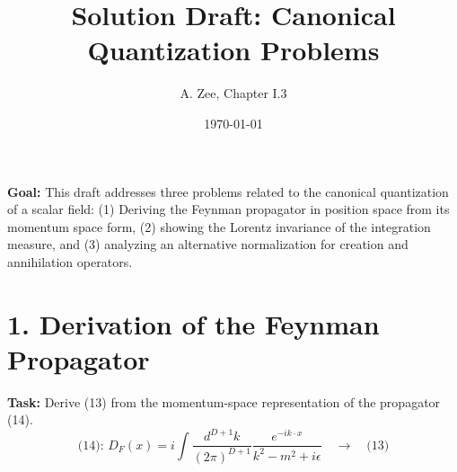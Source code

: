 \documentclass[11pt, a4paper]{article}
\title{Solution Draft: Canonical Quantization Problems}
\author{A. Zee, Chapter I.3}
\date{\today}
\begin{document}
\maketitle
\thispagestyle{empty}

\textbf{Goal:} This draft addresses three problems related to the canonical quantization of a scalar field: (1) Deriving the Feynman propagator in position space from its momentum space form, (2) showing the Lorentz invariance of the integration measure, and (3) analyzing an alternative normalization for creation and annihilation operators.

\section*{1. Derivation of the Feynman Propagator}
\textbf{Task:} Derive (13) from the momentum-space representation of the propagator (14).
\[ \text{(14): } D_F(x) = i \int \frac{d^{D+1}k}{(2\pi)^{D+1}} \frac{e^{-ik \cdot x}}{k^2 - m^2 + i\epsilon} \quad \longrightarrow \quad \text{(13)} \]
\end{document}
